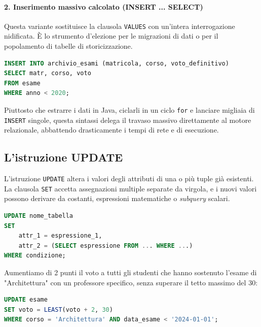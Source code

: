 \paragraph{2. Inserimento massivo calcolato (INSERT ... SELECT)}
Questa variante sostituisce la clausola \texttt{VALUES} con un'intera interrogazione nidificata. È lo strumento d'elezione per le migrazioni di dati o per il popolamento di tabelle di storicizzazione.

\begin{example}
\begin{lstlisting}[language=SQL, basicstyle=\ttfamily\small, keywordstyle=\color{blue}\bfseries]
INSERT INTO archivio_esami (matricola, corso, voto_definitivo)
SELECT matr, corso, voto
FROM esame
WHERE anno < 2020;
\end{lstlisting}
Piuttosto che estrarre i dati in Java, ciclarli in un ciclo \texttt{for} e lanciare migliaia di \texttt{INSERT} singole, questa sintassi delega il travaso massivo direttamente al motore relazionale, abbattendo drasticamente i tempi di rete e di esecuzione.
\end{example}

\subsection{L'istruzione UPDATE}

L'istruzione \texttt{UPDATE} altera i valori degli attributi di una o più tuple già esistenti. La clausola \texttt{SET} accetta assegnazioni multiple separate da virgola, e i nuovi valori possono derivare da costanti, espressioni matematiche o \textit{subquery} scalari.

\begin{lstlisting}[language=SQL, basicstyle=\ttfamily\small, keywordstyle=\color{blue}\bfseries]
UPDATE nome_tabella
SET 
    attr_1 = espressione_1,
    attr_2 = (SELECT espressione FROM ... WHERE ...)
WHERE condizione;
\end{lstlisting}

\begin{example}
Aumentiamo di 2 punti il voto a tutti gli studenti che hanno sostenuto l'esame di "Architettura" con un professore specifico, senza superare il tetto massimo del 30:
\begin{lstlisting}[language=SQL, basicstyle=\ttfamily\small, keywordstyle=\color{blue}\bfseries]
UPDATE esame
SET voto = LEAST(voto + 2, 30)
WHERE corso = 'Architettura' AND data_esame < '2024-01-01';
\end{lstlisting}
\end{example}

